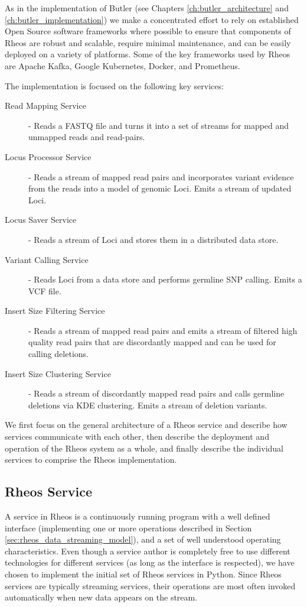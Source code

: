 As in the implementation of Butler (see Chapters \ref{ch:butler_architecture} and \ref{ch:butler_implementation}) we make a concentrated effort to rely on established Open Source software frameworks where possible to ensure that components of Rheos are robust and scalable, require minimal maintenance, and can be easily deployed on a variety of platforms. Some of the key frameworks used by Rheos are Apache Kafka, Google Kubernetes, Docker, and Prometheus.

The implementation is focused on the following key services:

\begin{description}
    \item [Read Mapping Service] - Reads a FASTQ file and turns it into a set of streams for mapped and unmapped reads and read-pairs.
    \item [Locus Processor Service] - Reads a stream of mapped read pairs and incorporates variant evidence from the reads into a model of genomic Loci. Emits a stream of updated Loci.
    \item [Locus Saver Service] - Reads a stream of Loci and stores them in a distributed data store.
    \item [Variant Calling Service] - Reads Loci from a data store and performs germline SNP calling. Emits a VCF file.
    \item [Insert Size Filtering Service] - Reads a stream of mapped read pairs and emits a stream of filtered high quality read pairs that are discordantly mapped and can be used for calling deletions.
    \item [Insert Size Clustering Service] - Reads a stream of discordantly mapped read pairs and calls germline deletions via KDE clustering. Emits a stream of deletion variants.
\end{description}

We first focus on the general architecture of a Rheos service and describe how services communicate with each other, then describe the deployment and operation of the Rheos system as a whole, and finally describe the individual services to comprise the Rheos implementation.

\subsection{Rheos Service}
A service in Rheos is a continuously running program with a well defined interface (implementing one or more operations described in Section \ref{sec:rheos_data_streaming_model}), and a set of well understood operating characteristics. Even though a service author is completely free to use different technologies for different services (as long as the interface is respected), we have chosen to implement the initial set of Rheos services in Python. Since Rheos services are typically streaming services, their operations are most often invoked automatically when new data appears on the stream.

